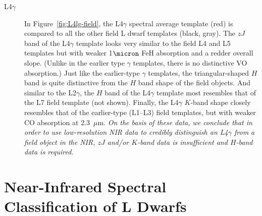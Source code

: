 \documentclass[12pt,preprint]{aastex}
\begin{document}
\begin{description}
\item[L4$\gamma$]{
In Figure~\ref{fig:L4lg-field}, the L4$\gamma$ spectral average template (red) is compared to all the other field L dwarf templates (black, gray). 
The $zJ$ band of the L4$\gamma$ template looks very similar to the field L4 and L5 templates but with weaker 1$\micron$ FeH absorption and a redder overall slope. (Unlike in the earlier type $\gamma$ templates, there is no distinctive VO absorption.)
Just like the earlier-type $\gamma$ templates, the triangular-shaped $H$ band is quite distinctive from the $H$ band shape of the field objects. And similar to the L2$\gamma$, the $H$ band of the L4$\gamma$ template most resembles that of the L7 field template (not shown).
Finally, the L4$\gamma$ $K$-band shape closely resembles that of the earlier-type (L1--L3) field templates, but with weaker CO absorption at 2.3~$\mu$m.
\emph{On the basis of these data, we conclude that in order to use low-resolution NIR data to credibly distinguish an L4$\gamma$ from a field object in the NIR, $zJ$ and/or $K$-band data is insufficient and $H$-band data is required.}
}
\end{description}



\clearpage
\section{Near-Infrared Spectral Classification of L Dwarfs}
\label{sec:classification}
\end{document}
